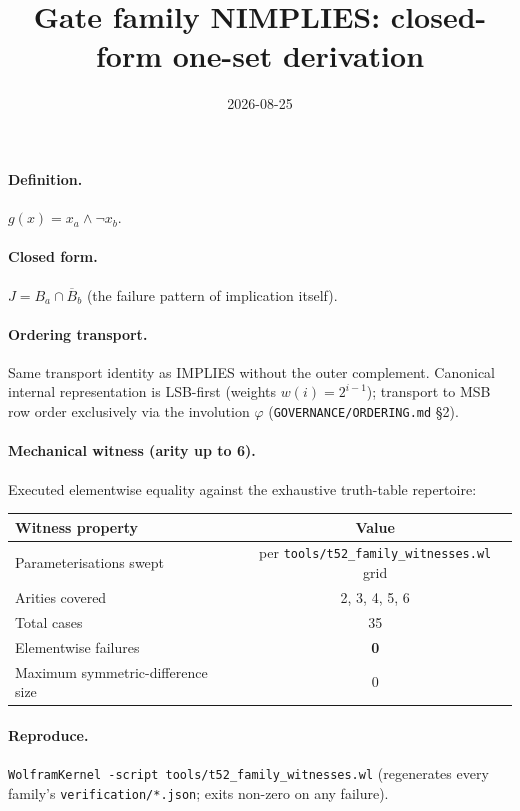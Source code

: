 \documentclass{article}
\title{Gate family NIMPLIES: closed-form one-set derivation}
\date{2026-08-25}
\begin{document}
\maketitle

\paragraph{Definition.} $g(x)=x_{a}\wedge\neg x_{b}$.

\paragraph{Closed form.} $J=B_{a}\cap\overline{B}_{b}$ (the failure pattern of implication itself).

\paragraph{Ordering transport.} Same transport identity as IMPLIES without the outer complement.
Canonical internal representation is LSB-first (weights $w(i)=2^{i-1}$);
transport to MSB row order exclusively via the involution $\varphi$
(\texttt{GOVERNANCE/ORDERING.md} \S2).

\paragraph{Mechanical witness (arity up to 6).} Executed elementwise equality
against the exhaustive truth-table repertoire:
\begin{center}
\begin{tabular}{lc}
\hline
Witness property & Value \\ \hline
Parameterisations swept & per \texttt{tools/t52_family_witnesses.wl} grid \\
Arities covered & 2, 3, 4, 5, 6 \\
Total cases & 35 \\
Elementwise failures & \textbf{0} \\
Maximum symmetric-difference size & 0 \\ \hline
\end{tabular}
\end{center}

\paragraph{Reproduce.} \texttt{WolframKernel -script tools/t52_family_witnesses.wl}
(regenerates every family's \texttt{verification/*.json}; exits non-zero on any failure).
\end{document}
